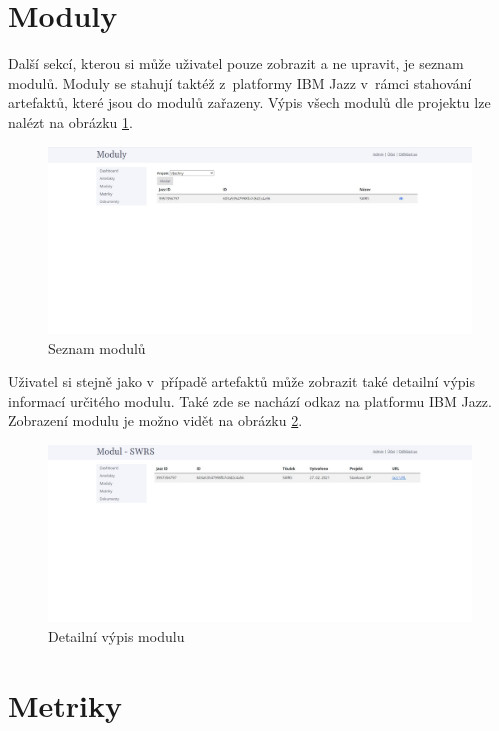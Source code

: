 \documentclass[czech,master]{diploma}
\begin{document}
\section{Moduly}
Další sekcí, kterou si může uživatel pouze zobrazit a ne upravit, je seznam modulů. Moduly se stahují taktéž z~platformy IBM Jazz v~rámci stahování artefaktů, které jsou do modulů zařazeny. Výpis všech modulů dle projektu lze nalézt na obrázku \ref{fig:metrics_tool_modules}.

\begin{figure}[!ht]
    \centering
    \includegraphics[width=1\textwidth]{Diplomka/Figures/metrics_tool/modules.jpg}
    \caption{Seznam modulů}
    \label{fig:metrics_tool_modules}
\end{figure}
Uživatel si stejně jako v~případě artefaktů může zobrazit také detailní výpis informací určitého modulu. Také zde se nachází odkaz na platformu IBM Jazz. Zobrazení modulu je možno vidět na obrázku \ref{fig:metrics_tool_modules_detail}.


\begin{figure}[!ht]
    \centering
    \includegraphics[width=1\textwidth]{Diplomka/Figures/metrics_tool/modules_detail.jpg}
    \caption{Detailní výpis modulu}
    \label{fig:metrics_tool_modules_detail}
\end{figure}

\newpage

\section{Metriky}
\end{document}
